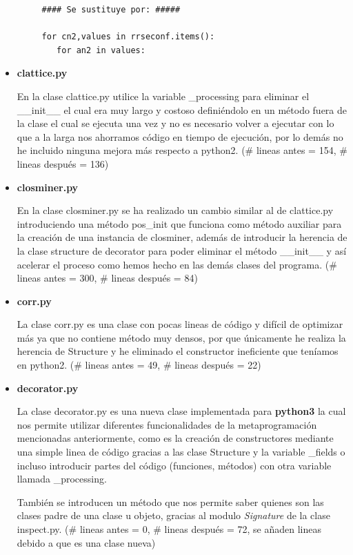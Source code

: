\documentclass{cosas/tfg_domingo}
\begin{document}
\begin{itemize}
\begin{verbatim}
     #### Se sustituye por: #####
     
     for cn2,values in rrseconf.items():
        for an2 in values:
\end{verbatim}

\item \textbf{clattice.py}

En la clase clattice.py utilice la variable \_processing para eliminar el \_\_init\_\_ el cual era muy largo y costoso definiéndolo en un método fuera de la clase el cual se ejecuta una vez y no es necesario volver a ejecutar con lo que a la larga nos ahorramos código en tiempo de ejecución, por lo demás no he incluido ninguna mejora más respecto a python2. (\# lineas antes = 154, \# lineas después = 136)

\item \textbf{closminer.py}

En la clase closminer.py se ha realizado un cambio similar al de clattice.py introduciendo una método pos\_init que funciona como método auxiliar para la creación de una instancia de closminer, además de introducir la herencia de la clase structure de decorator para poder eliminar el método \_\_init\_\_ y así acelerar el proceso como hemos hecho en las demás clases del programa. (\# lineas antes = 300, \# lineas después = 84)

\item \textbf{corr.py}

La clase corr.py es una clase con pocas lineas de código y difícil de optimizar más ya que no contiene método muy densos, por que únicamente he realiza la herencia de Structure y he eliminado el constructor ineficiente que teníamos en python2. (\# lineas antes = 49, \# lineas después = 22)

\item \textbf{decorator.py}

La clase decorator.py es una nueva clase implementada para \textbf{python3} la cual nos permite utilizar diferentes funcionalidades de la metaprogramación mencionadas anteriormente, como es la creación de constructores mediante una simple linea de código gracias a las clase Structure  y la variable \_fields o incluso introducir partes del código (funciones, métodos) con otra variable llamada \_processing.

También se introducen un método que nos permite saber quienes son las clases padre de una clase u objeto, gracias al modulo \textit{Signature} de la clase inspect.py. (\# lineas antes = 0, \# lineas después = 72, se añaden lineas debido a que es una clase nueva)


\end{itemize}
\end{document}
